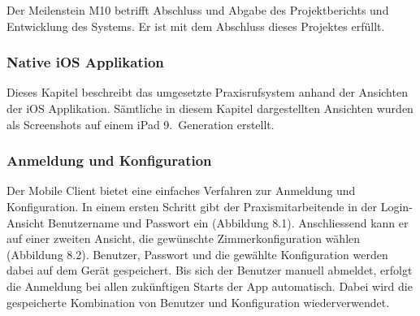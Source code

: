 Der Meilenstein M10 betrifft Abschluss und Abgabe des Projektberichts und Entwicklung des Systems.
Er ist mit dem Abschluss dieses Projektes erfüllt.

\subsubsection{Native iOS Applikation}

Dieses Kapitel beschreibt das umgesetzte Praxisrufsystem anhand der Ansichten der iOS Applikation.
Sämtliche in diesem Kapitel dargestellten Ansichten wurden als Screenshots auf einem iPad 9.\ Generation erstellt.

\subsubsection*{Anmeldung und Konfiguration}

Der Mobile Client bietet eine einfaches Verfahren zur Anmeldung und Konfiguration.
In einem ersten Schritt gibt der Praxismitarbeitende in der Login-Ansicht Benutzername und Passwort ein (Abbildung 8.1).
Anschliessend kann er auf einer zweiten Ansicht, die gewünschte Zimmerkonfiguration wählen (Abbildung 8.2).
Benutzer, Passwort und die gewählte Konfiguration werden dabei auf dem Gerät gespeichert.
Bis sich der Benutzer manuell abmeldet, erfolgt die Anmeldung bei allen zukünftigen Starts der App automatisch.
Dabei wird die gespeicherte Kombination von Benutzer und Konfiguration wiederverwendet.


